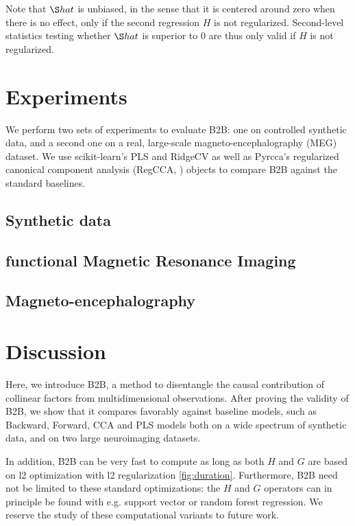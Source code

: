 \documentclass[preprint,12pt,3p]{elsarticle}
\begin{document}
Note that $\S hat$ is unbiased, in the sense that it is centered around zero when there is no
effect, only if the second regression $H$ is not regularized. Second-level
statistics testing whether $\S hat$ is superior to 0 are thus only valid if $H$
is not regularized.

\section{Experiments}

We perform two sets of experiments to evaluate B2B: one on controlled synthetic
data, and a second one on a real, large-scale magneto-encephalography (MEG)
dataset.
%
We use scikit-learn's PLS and RidgeCV \citep{sklearn} as well as Pyrcca's
regularized canonical component analysis (RegCCA, \citep{bilenko2016pyrcca})
objects to compare B2B against the standard baselines.

\subsection{Synthetic data}
\label{sec:experiment_synthetic}


\subsection{functional Magnetic Resonance Imaging}
\label{sec:experiment_fmri}


\subsection{Magneto-encephalography}
\label{sec:experiment_real}


\section{Discussion}

Here, we introduce B2B, a method to disentangle the causal contribution of
collinear factors from multidimensional observations. After proving the validity
of B2B, we show that it compares favorably against baseline models, such as
Backward, Forward, CCA and PLS models both on a wide spectrum of synthetic data,
and on two large neuroimaging datasets.

In addition, B2B can be very fast to compute as long as both $H$ and $G$ are based
on l2 optimization with l2 regularization \ref{fig:duration}. Furthermore, B2B
need not be limited to these standard optimizations: the $H$ and $G$ operators
can in principle be found with e.g. support vector or random forest regression.
We reserve the study of these computational variants to future work.
\end{document}
